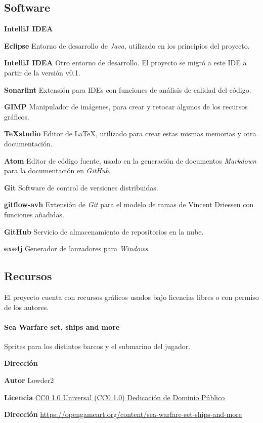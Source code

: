 \documentclass[a4paper,
	11pt,
	parskip=full,
	bibliography=totoc,
	twoside
	]{scrartcl}
\begin{document}
	\subsection{Software}
	\begin{labeling}{\textbf{IntelliJ IDEA}}
		\item[\textbf{Eclipse}] Entorno de desarrollo de \textit{Java}, utilizado en los principios del proyecto.
		\item[\textbf{IntelliJ IDEA}] Otro entorno de desarrollo. El proyecto se migró a este IDE a partir de la versión v0.1.
		\item[\textbf{Sonarlint}] Extensión para IDEs con funciones de análisis de calidad del código.
		\item[\textbf{GIMP}] Manipulador de imágenes, para crear y retocar algunos de los recursos gráficos.
		\item[\textbf{TeXstudio}] Editor de \LaTeX, utilizado para crear estas mismas memorias y otra documentación.
		\item[\textbf{Atom}] Editor de código fuente, usado en la generación de documentos \textit{Markdown} para la documentación en \textit{GitHub}.
		\item[\textbf{Git}] Software de control de versiones distribuidas.
		\item[\textbf{gitflow-avh}] Extensión de \textit{Git} para el modelo de ramas de Vincent Driessen con funciones añadidas.
		\item[\textbf{GitHub}] Servicio de almacenamiento de repositorios en la nube.
		\item[\textbf{exe4j}] Generador de lanzadores para \textit{Windows}.
	\end{labeling}
	
	\subsection{Recursos}
	\label{subsec:recursos}
	El proyecto cuenta con recursos gráficos usados bajo licencias libres o con permiso de los autores.
	
	\paragraph{Sea Warfare set, ships and more}
		Sprites para los distintos barcos y el submarino del jugador.
		\begin{labeling}{\textbf{Dirección}}
			\item[\textbf{Autor}] Lowder2
			\item[\textbf{Licencia}] \href{https://creativecommons.org/publicdomain/zero/1.0/deed.es}{CC0 1.0 Universal (CC0 1.0)
				Dedicación de Dominio Público}
			\item[\textbf{Dirección}] \href{https://opengameart.org/content/sea-warfare-set-ships-and-more}{https://opengameart.org/content/sea-warfare-set-ships-and-more}
		\end{labeling}
	
\end{document}
